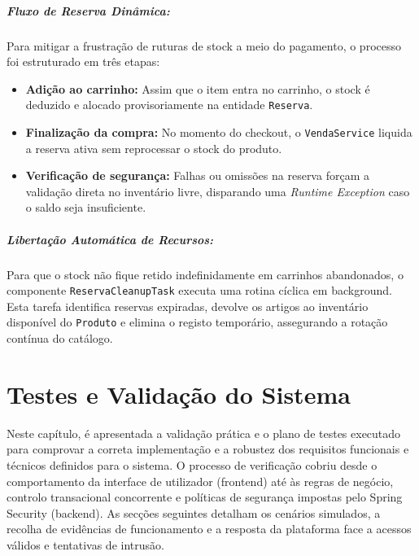 \documentclass[11pt,a4paper,oneside]{report}
\begin{document}
\paragraph{Fluxo de Reserva Dinâmica:}
Para mitigar a frustração de ruturas de stock a meio do pagamento, o processo foi estruturado em três etapas:
\begin{itemize}
    \item \textbf{Adição ao carrinho:} Assim que o item entra no carrinho, o stock é deduzido e alocado provisoriamente na entidade \texttt{Reserva}.
    \item \textbf{Finalização da compra:} No momento do checkout, o \texttt{VendaService} liquida a reserva ativa sem reprocessar o stock do produto.
    \item \textbf{Verificação de segurança:} Falhas ou omissões na reserva forçam a validação direta no inventário livre, disparando uma \textit{Runtime Exception} caso o saldo seja insuficiente.
\end{itemize}

\paragraph{Libertação Automática de Recursos:}
Para que o stock não fique retido indefinidamente em carrinhos abandonados, o componente \texttt{ReservaCleanupTask} executa uma rotina cíclica em background. Esta tarefa identifica reservas expiradas, devolve os artigos ao inventário disponível do \texttt{Produto} e elimina o registo temporário, assegurando a rotação contínua do catálogo.


\chapter{Testes e Validação do Sistema}
Neste capítulo, é apresentada a validação prática e o plano de testes executado para comprovar a correta implementação e a robustez dos requisitos funcionais e técnicos definidos para o sistema. O processo de verificação cobriu desde o comportamento da interface de utilizador (frontend) até às regras de negócio, controlo transacional concorrente e políticas de segurança impostas pelo Spring Security (backend). As secções seguintes detalham os cenários simulados, a recolha de evidências de funcionamento e a resposta da plataforma face a acessos válidos e tentativas de intrusão.
\end{document}

